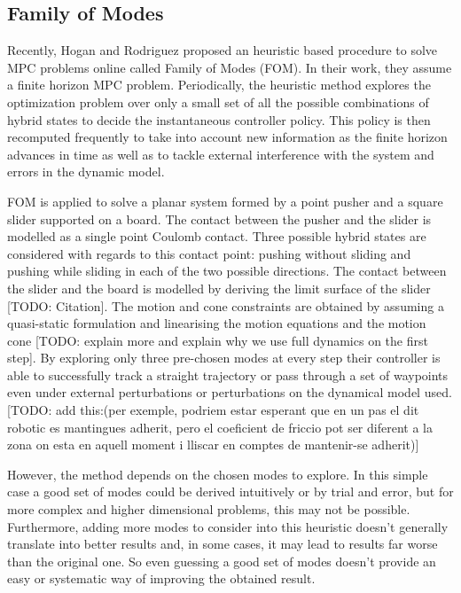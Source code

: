 \documentclass[12,twoside]{TFG-GM}
\theoremstyle{definition}
\theoremstyle{remark}
\begin{document}
\subsection{Family of Modes}
\label{subsec:FOM}
Recently, Hogan and Rodriguez \cite{fom} proposed an heuristic based procedure to solve MPC problems online called Family of Modes (FOM). In their work, they assume a finite horizon MPC problem. Periodically, the heuristic method explores the optimization problem over only a small set of all the possible combinations of hybrid states to decide the instantaneous controller policy. This policy is then recomputed frequently to take into account new information as the finite horizon advances in time as well as to tackle external interference with the system and errors in the dynamic model.

FOM is applied to solve a planar system formed by a point pusher and a square slider supported on a board. The contact between the pusher and the slider is modelled as a single point Coulomb contact. Three possible hybrid states are considered with regards to this contact point: pushing without sliding and pushing while sliding in each of the two possible directions. The contact between the slider and the board is modelled by deriving the limit surface of the slider [TODO: Citation]. The motion and cone constraints are obtained by assuming a quasi-static formulation and linearising the motion equations and the motion cone [TODO: explain more and explain why we use full dynamics on the first step]. By exploring only three pre-chosen modes at every step their controller is able to successfully track a straight trajectory or pass through a set of waypoints even under external perturbations or perturbations on the dynamical model used. [TODO: add this:(per exemple, podriem estar esperant que en un pas el dit robotic es mantingues adherit, pero el coeficient de friccio pot ser diferent a la zona on esta en aquell moment i lliscar en comptes de mantenir-se adherit)]

However, the method depends on the chosen modes to explore. In this simple case a good set of modes could be derived intuitively or by trial and error, but for more complex and higher dimensional problems, this may not be possible. Furthermore, adding more modes to consider into this heuristic doesn't generally translate into better results and, in some cases, it may lead to results far worse than the original one. So even guessing a good set of modes doesn't provide an easy or systematic way of improving the obtained result.
\end{document}
